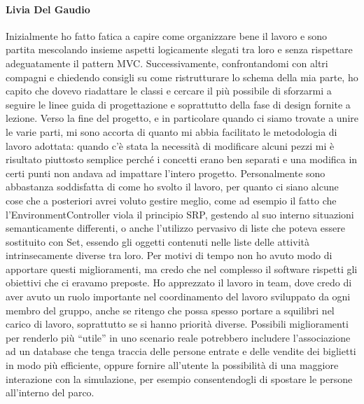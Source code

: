 \documentclass[a4paper,12pt]{report}
\begin{document}
\paragraph{Livia Del Gaudio} Inizialmente ho fatto fatica a capire come organizzare bene il lavoro e sono partita mescolando insieme aspetti logicamente slegati tra loro e senza rispettare adeguatamente il pattern MVC. Successivamente, confrontandomi con altri compagni e chiedendo consigli su come ristrutturare lo schema della mia parte, ho capito che dovevo riadattare le classi e cercare il più possibile di sforzarmi a seguire le linee guida di progettazione e soprattutto della fase di design fornite a lezione. Verso la fine del progetto, e in particolare quando ci siamo trovate a unire le varie parti, mi sono accorta di quanto mi abbia facilitato le metodologia di lavoro adottata: quando c’è stata la necessità di modificare alcuni pezzi mi è risultato piuttosto semplice perché i concetti erano ben separati e una modifica in certi punti non andava ad impattare l’intero progetto. Personalmente sono abbastanza soddisfatta di come ho svolto il lavoro, per quanto ci siano alcune cose che a posteriori avrei voluto gestire meglio, come ad esempio il fatto che l’EnvironmentController viola il principio SRP, gestendo al suo interno situazioni semanticamente differenti, o anche l’utilizzo pervasivo di liste che poteva essere sostituito con Set, essendo gli oggetti contenuti nelle liste delle attività intrinsecamente diverse tra loro. Per motivi di tempo non ho avuto modo di apportare questi miglioramenti, ma credo che nel complesso il software rispetti gli obiettivi che ci eravamo preposte. Ho apprezzato il lavoro in team, dove credo di aver avuto un ruolo importante nel coordinamento del lavoro sviluppato da ogni membro del gruppo, anche se ritengo che possa spesso portare a squilibri nel carico di lavoro, soprattutto se si hanno priorità diverse. Possibili miglioramenti per renderlo più “utile” in uno scenario reale potrebbero includere l’associazione ad un database che tenga traccia delle persone entrate e delle vendite dei biglietti in modo più efficiente, oppure fornire all’utente la possibilità di una maggiore interazione con la simulazione, per esempio consentendogli di spostare le persone all’interno del parco.
\end{document}
